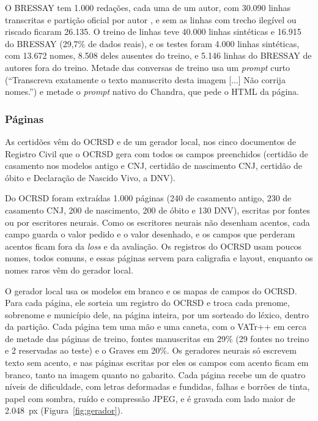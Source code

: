 O BRESSAY tem 1.000 redações, cada uma de um autor, com 30.090 linhas transcritas e partição oficial por autor \cite{bressay2023}, e sem as linhas com trecho ilegível ou riscado ficaram 26.135. O treino de linhas teve 40.000 linhas sintéticas e 16.915 do BRESSAY (29,7\% de dados reais), e os testes foram 4.000 linhas sintéticas, com 13.672 nomes, 8.508 deles ausentes do treino, e 5.146 linhas do BRESSAY de autores fora do treino. Metade das conversas de treino usa um \emph{prompt} curto (``Transcreva exatamente o texto manuscrito desta imagem [...] Não corrija nomes.'') e metade o \emph{prompt} nativo do Chandra, que pede o HTML da página.

\subsubsection{Páginas}
\label{subsec:dados-paginas}
As certidões vêm do OCRSD e de um gerador local, nos cinco documentos de Registro Civil que o OCRSD gera com todos os campos preenchidos (certidão de casamento nos modelos antigo e CNJ, certidão de nascimento CNJ, certidão de óbito e Declaração de Nascido Vivo, a DNV).

Do OCRSD foram extraídas 1.000 páginas (240 de casamento antigo, 230 de casamento CNJ, 200 de nascimento, 200 de óbito e 130 DNV), escritas por fontes ou por escritores neurais. Como os escritores neurais não desenham acentos, cada campo guarda o valor pedido e o valor desenhado, e os campos que perderam acentos ficam fora da \emph{loss} e da avaliação. Os registros do OCRSD usam poucos nomes, todos comuns, e essas páginas servem para caligrafia e layout, enquanto os nomes raros vêm do gerador local.

O gerador local usa os modelos em branco e os mapas de campos do OCRSD. Para cada página, ele sorteia um registro do OCRSD e troca cada prenome, sobrenome e município dele, na página inteira, por um sorteado do léxico, dentro da partição. Cada página tem uma mão e uma caneta, com o VATr++ em cerca de metade das páginas de treino, fontes manuscritas em 29\% (29 fontes no treino e 2 reservadas ao teste) e o Graves em 20\%. Os geradores neurais só escrevem texto sem acento, e nas páginas escritas por eles os campos com acento ficam em branco, tanto na imagem quanto no gabarito. Cada página recebe um de quatro níveis de dificuldade, com letras deformadas e fundidas, falhas e borrões de tinta, papel com sombra, ruído e compressão JPEG, e é gravada com lado maior de 2.048~px (Figura~\ref{fig:gerador}).

